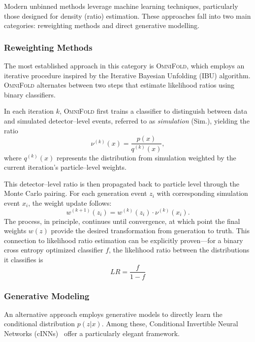         Modern unbinned methods leverage machine learning techniques, particularly those designed for density (ratio) estimation.
        These approaches fall into two main categories: reweighting methods and direct generative modelling.
        \subsubsection{Reweighting Methods}
            The most established approach in this category is \textsc{OmniFold}, which employs an iterative procedure inspired by the Iterative Bayesian Unfolding (IBU) algorithm.
            \textsc{OmniFold} alternates between two steps that estimate likelihood ratios using binary classifiers.
            
            In each iteration \(k\), \textsc{OmniFold} first trains a classifier to distinguish between data and simulated detector--level events, referred to as \emph{simulation} (Sim.), yielding the ratio
            \begin{equation}
                \nu^{(k)}(x) = \frac{p(x)}{q^{(k)}(x)},
            \end{equation}
            where \(q^{(k)}(x)\) represents the distribution from simulation weighted by the current iteration's particle--level weights.

            This detector--level ratio is then propagated back to particle level through the Monte Carlo pairing.
            For each generation event \(z_i\) with corresponding simulation event \(x_i\), the weight update follows:
            \begin{equation}
                w^{(k+1)}(z_i) = w^{(k)}(z_i) \cdot \nu^{(k)}(x_i).
            \end{equation}
            The process, in principle, continues until convergence, at which point the final weights \(w(z)\) provide the desired transformation from generation to truth.
            This connection to likelihood ratio estimation can be explicitly proven---for a binary cross entropy optimized classifier \(f\), the likelihood ratio between the distributions it classifies is
            \[
                LR = \frac{f}{1-f}
            \]
        \subsubsection{Generative Modeling}
            An alternative approach employs generative models to directly learn the conditional distribution \(p(z|x)\).
            Among these, Conditional Invertible Neural Networks (cINNs)~\cite{AnanthaPadmanabha2021SolvingNetworks} offer a particularly elegant framework.
            
